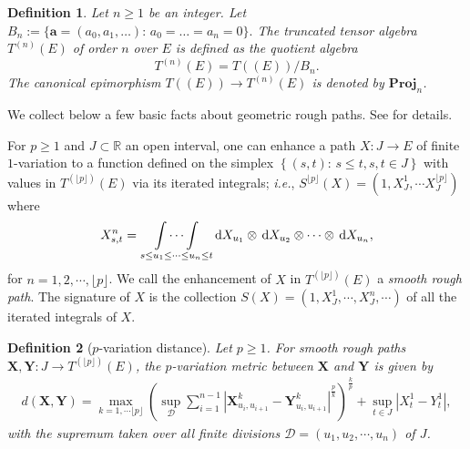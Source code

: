 \documentclass[11pt,a4paper,english,reqno]{amsart}
\theoremstyle{plain}
\newtheorem{definition}{Definition}[section]
\newcommand{\R}{\mathbb{R}}
\newcommand{\dd}{{\rm d}}
\newcommand{\1}{\mathbbm{1}}
\newcommand{\proj}{\mathbf{Proj}}
\begin{document}
\begin{definition}
Let $n\geq 1$ be an integer. Let $B_{n}:=\{\mathbf{a}
=(a_{0},a_{1},\ldots):\,a_{0}=\ldots=a_{n}=0\}.$ The truncated tensor algebra $%
T^{(n)}(E)$ of order $n$ over $E$ is defined as the quotient algebra
\begin{equation*}
T^{(n)}(E)=T\left( \left( E\right) \right) /B_{n}.
\end{equation*}%
The canonical epimorphism $T\left( \left( E\right) \right) \rightarrow
T^{(n)}(E)$ is denoted by $\proj_{n}$.
\end{definition}

We collect below a few basic facts about geometric rough paths. See \cite{lyons2007differential, coutin2002stochastic, friz2006note} for details.

For $p \geq 1$ and $J \subset \R$ an open interval, one can enhance a path $X: J \rightarrow E$ of finite $1$-variation to a function defined on the simplex $\left\{(s, t):\, s \leq t, s,t \in J\right\}$ with values in $T^{(\lfloor p \rfloor)}(E)$ via its iterated integrals; \emph{i.e.}, $S^{\lfloor p \rfloor}(X) = \left(1, X^{1}_{J}, \cdots X^{\lfloor p \rfloor}_{J}\right)$ where
\begin{eqnarray*}
X^{n}_{s, t} = \underset{s \leq u_1 \leq \cdots \leq u_n \leq t }{\int \cdots \int} \,\dd X_{u_{1}} \otimes \,\dd X_{u_{2}}\otimes \cdots \otimes  \,\dd X_{u_{n}},
\end{eqnarray*}
for $n = 1, 2, \cdots, \lfloor p \rfloor$. We call the enhancement of $X$ in $T^{(\lfloor p \rfloor)}(E)$ a \emph{smooth rough path}. The signature of $X$ is the collection $S(X) = \left(1, X^{1}_{J}, \cdots, X^{n}_{J}, \cdots\right)$ of all the iterated integrals of $X$.
\begin{definition}[$p$-variation distance]
Let $p \geq 1$. For smooth rough paths $\mathbf{X}, \mathbf{Y}:J \to T^{(\lfloor p \rfloor)}(E)$, the $p$-variation metric between $\mathbf{X}$ and $\mathbf{Y}$ is given by
\begin{eqnarray*}
d(\mathbf{X}, \mathbf{Y}) = \max_{k = 1, \cdots \lfloor p \rfloor} \left(\sup_{\mathcal{D}}\sum_{i = 1}^{n-1} \left\vert \mathbf{X}_{u_i, u_{i+1}}^{k} - \mathbf{Y}_{u_{i}, u_{i+1}}^{k} \right\vert^{\frac{p}{k}}\right)^{\frac{k}{p}} + \sup_{t \in J} \left\vert X^{1}_t - Y^{1}_{t}\right\vert,
\end{eqnarray*}
with the supremum taken over all finite divisions $\mathcal{D} = (u_{1}, u_{2}, \cdots, u_{n})$ of $J$.
\end{definition}
\end{document}

